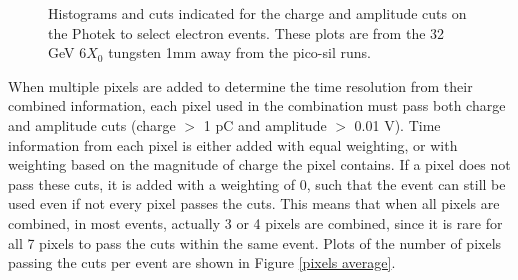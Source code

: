 \documentclass[twocolumn,aps,prd,reprint]{revtex4-1}
\begin{document}
\begin{figure}[!htbp]
\caption{Histograms and cuts indicated for the charge and amplitude cuts on the Photek to select electron events. These plots are from the 32 GeV $6X_0$ tungsten 1mm away from the pico-sil runs.}
\label{charge amp cuts}
\end{figure}

When multiple pixels are added to determine the time resolution from their combined information, each pixel used in the combination must pass both charge and amplitude cuts (charge $>$ 1 pC and amplitude $>$ 0.01 V). Time information from each pixel is either added with equal weighting, or with weighting based on the magnitude of charge the pixel contains. If a pixel does not pass these cuts, it is added with a weighting of 0, such that the event can still be used even if not every pixel passes the cuts. This means that when all pixels are combined, in most events, actually 3 or 4 pixels are combined, since it is rare for all 7 pixels to pass the cuts within the same event. Plots of the number of pixels passing the cuts per event are shown in Figure \ref{pixels average}.
\end{document}
